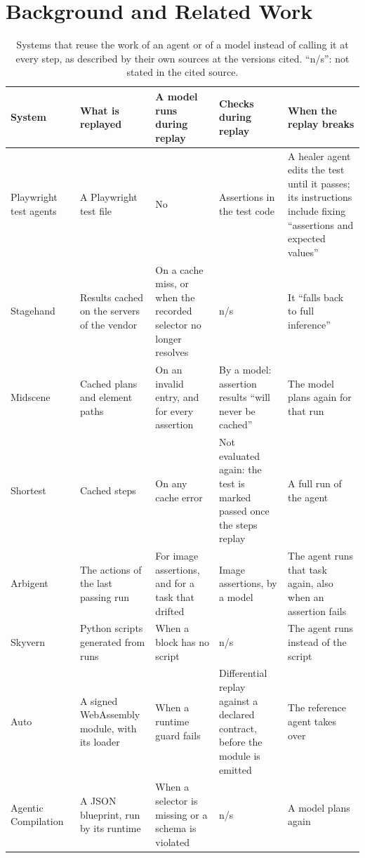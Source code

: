 \section{Background and Related Work}
\label{sec:related}

\begin{table}[t]
\caption{Systems that reuse the work of an agent or of a model instead of calling it at every step, as described by their own sources at the versions cited. ``n/s'': not stated in the cited source.}
\label{tab:related}
\footnotesize
\begin{tabular}{@{}L{2.2cm}L{3.0cm}L{3.45cm}L{3.45cm}L{3.95cm}@{}}
\toprule
System & What is replayed & A model runs during replay & Checks during replay & When the replay breaks \\
\midrule
Playwright test agents~\cite{playwrightagents} & A Playwright test file & No & Assertions in the test code & A healer agent edits the test until it passes; its instructions include fixing ``assertions and expected values'' \\
Stagehand~\cite{stagehand} & Results cached on the servers of the vendor & On a cache miss, or when the recorded selector no longer resolves & n/s & It ``falls back to full inference'' \\
Midscene~\cite{midscene} & Cached plans and element paths & On an invalid entry, and for every assertion & By a model: assertion results ``will never be cached'' & The model plans again for that run \\
Shortest~\cite{shortest} & Cached steps & On any cache error & Not evaluated again: the test is marked passed once the steps replay & A full run of the agent \\
Arbigent~\cite{arbigent} & The actions of the last passing run & For image assertions, and for a task that drifted & Image assertions, by a model & The agent runs that task again, also when an assertion fails \\
Skyvern~\cite{skyvern} & Python scripts generated from runs & When a block has no script & n/s & The agent runs instead of the script \\
Auto~\cite{jaber2026auto} & A signed WebAssembly module, with its loader & When a runtime guard fails & Differential replay against a declared contract, before the module is emitted & The reference agent takes over \\
Agentic Compilation~\cite{chundru2026agentic} & A JSON blueprint, run by its runtime & When a selector is missing or a schema is violated & n/s & A model plans again \\

\end{tabular}
\end{table}
